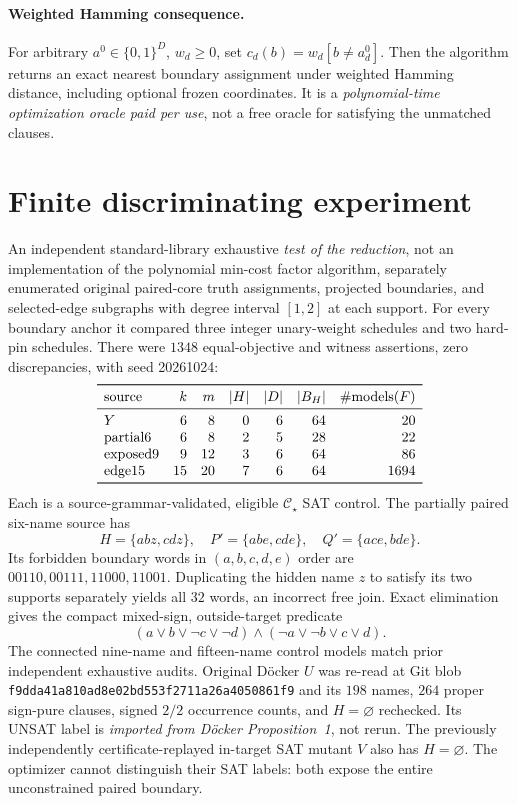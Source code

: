 \documentclass[11pt]{article}
\newcommand{\CS}{\mathcal C_\star}
\begin{document}
\paragraph{Weighted Hamming consequence.} For arbitrary $a^0\in\{0,1\}^D$, $w_d\ge0$, set $c_d(b)=w_d[b\ne a^0_d]$. Then the algorithm returns an exact nearest boundary assignment under weighted Hamming distance, including optional frozen coordinates. It is a \emph{polynomial-time optimization oracle paid per use}, not a free oracle for satisfying the unmatched clauses.

\section{Finite discriminating experiment}
An independent standard-library exhaustive \emph{test of the reduction}, not an implementation of the polynomial min-cost factor algorithm, separately enumerated original paired-core truth assignments, projected boundaries, and selected-edge subgraphs with degree interval $[1,2]$ at each support. For every boundary anchor it compared three integer unary-weight schedules and two hard-pin schedules. There were $1348$ equal-objective and witness assertions, zero discrepancies, with seed 20261024:
\[
\begin{array}{lrrrrrr}
\toprule
\mathrm{source}&k&m&|H|&|D|&|B_H|&\#\mathrm{models}(F)\\
\midrule
Y&6&8&0&6&64&20\\
\mathrm{partial6}&6&8&2&5&28&22\\
\mathrm{exposed9}&9&12&3&6&64&86\\
\mathrm{edge15}&15&20&7&6&64&1694\\
\bottomrule
\end{array}
\]
Each is a source-grammar-validated, eligible $\CS$ SAT control. The partially paired six-name source has
\[
H=\{abz,cdz\},\quad P'=\{abe,cde\},\quad Q'=\{ace,bde\}.
\]
Its forbidden boundary words in $(a,b,c,d,e)$ order are $00110,00111,11000,11001$. Duplicating the hidden name $z$ to satisfy its two supports separately yields all $32$ words, an incorrect free join. Exact elimination gives the compact mixed-sign, outside-target predicate
\[
(a\lor b\lor\neg c\lor\neg d)\wedge(\neg a\lor\neg b\lor c\lor d).
\]
The connected nine-name and fifteen-name control models match prior independent exhaustive audits. Original D\"ocker $U$ was re-read at Git blob \texttt{f9dda41a810ad8e02bd553f2711a26a4050861f9} and its $198$ names, $264$ proper sign-pure clauses, signed $2/2$ occurrence counts, and $H=\varnothing$ rechecked. Its UNSAT label is \emph{imported from D\"ocker Proposition~1}, not rerun. The previously independently certificate-replayed in-target SAT mutant $V$ also has $H=\varnothing$. The optimizer cannot distinguish their SAT labels: both expose the entire unconstrained paired boundary.
\end{document}
